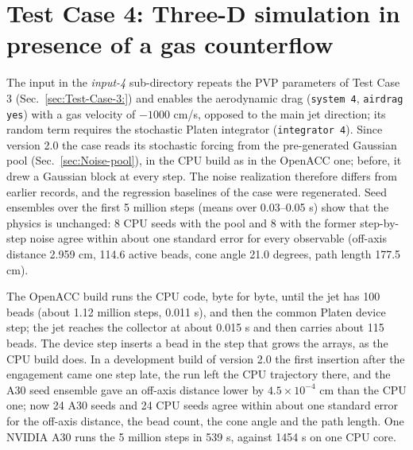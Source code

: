 \section{Test Case 4: Three-D simulation in presence of a gas counterflow}

The input in the \textit{input-4} sub-directory repeats the PVP parameters
of Test Case 3 (Sec.~\ref{sec:Test-Case-3:}) and enables the aerodynamic
drag (\texttt{system 4}, \texttt{airdrag yes}) with a gas velocity of
$-1000$ cm/s, opposed to the main jet direction; its random term requires
the stochastic Platen integrator (\texttt{integrator 4}).  Since version
2.0 the case reads its stochastic forcing from the pre-generated Gaussian
pool (Sec.~\ref{sec:Noise-pool}), in the CPU build as in the OpenACC one;
before, it drew a Gaussian block at every step.  The noise realization
therefore differs from earlier records, and the regression baselines of the
case were regenerated.  Seed ensembles over the first 5 million steps (means
over 0.03--0.05 s) show that the physics is unchanged: 8 CPU seeds with the
pool and 8 with the former step-by-step noise agree within about one
standard error for every observable (off-axis distance 2.959 cm, 114.6
active beads, cone angle 21.0 degrees, path length 177.5 cm).

The OpenACC build runs the CPU code, byte for byte, until the jet has 100
beads (about 1.12 million steps, 0.011 s), and then the common Platen device
step; the jet reaches the collector at about 0.015 s and then carries about
115 beads.  The device step inserts a bead in the step
that grows the arrays, as the CPU build does.  In a development build of
version 2.0 the first insertion
after the engagement came one step late, the run left the CPU trajectory
there, and the A30 seed ensemble gave an off-axis distance lower by
$4.5\times10^{-4}$ cm than the CPU one; now 24 A30 seeds and 24 CPU seeds
agree within about one standard error for the off-axis distance, the bead
count, the cone angle and the path length.  One NVIDIA A30 runs the 5
million steps in 539 s, against 1454 s on one CPU core.
